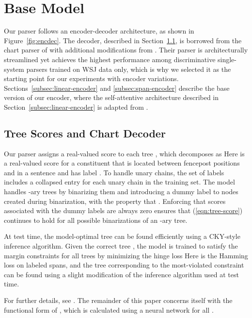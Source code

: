 \documentclass[11pt,a4paper]{article}
\begin{document}
\section{Base Model}
\label{sec:base-model}

Our parser follows an encoder-decoder architecture, as shown in Figure~\ref{fig:encdec}. The decoder, described in Section~\ref{subsec:decoder}, is borrowed from the chart parser of \citet{stern_minimal_2017} with additional modifications from \citet{gaddy_analysis_2018}. Their parser is architecturally streamlined yet achieves the highest performance among discriminative single-system parsers trained on WSJ data only, which is why we selected it as the starting point for our experiments with encoder variations. Sections~\ref{subsec:linear-encoder} and \ref{subsec:span-encoder} describe the base version of our encoder, where the self-attentive architecture described in Section~\ref{subsec:linear-encoder} is adapted from \citet{vaswani_attention_2017}.

\subsection{Tree Scores and Chart Decoder}
\label{subsec:decoder}

Our parser assigns a real-valued score  to each tree , which decomposes as 
Here  is a real-valued score for a constituent that is located between fencepost positions  and  in a sentence and has label . To handle unary chains, the set of labels includes a collapsed entry for each unary chain in the training set. The model handles -ary trees by binarizing them and introducing a dummy label  to nodes created during binarization, with the property that . Enforcing that scores associated with the dummy labels are always zero ensures that (\ref{eqn:tree-score}) continues to hold for all possible binarizations of an -ary tree.

At test time, the model-optimal tree  can be found efficiently using a CKY-style inference algorithm. Given the correct tree , the model is trained to satisfy the margin constraints  for all trees  by minimizing the hinge loss 
Here  is the Hamming loss on labeled spans, and the tree corresponding to the most-violated constraint can be found using a slight modification of the inference algorithm used at test time.

For further details, see \citet{gaddy_analysis_2018}. The remainder of this paper concerns itself with the functional form of , which is calculated using a neural network for all .
\end{document}

